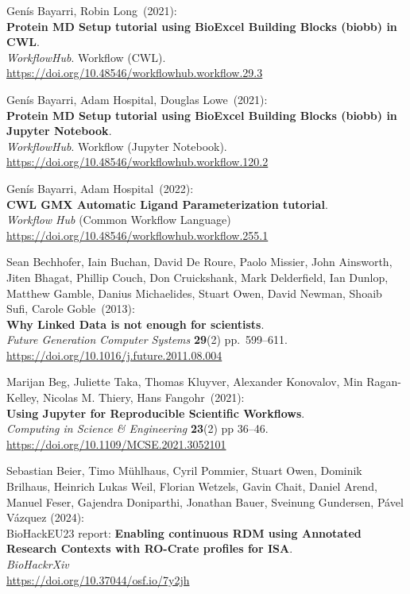 \begin{thebibliography}{9}
Genís Bayarri, Robin Long~(2021): \\
\textbf{Protein MD Setup tutorial using BioExcel Building Blocks (biobb) in CWL}.\\
\emph{WorkflowHub}. Workflow (CWL).\\
\url{https://doi.org/10.48546/workflowhub.workflow.29.3}

Genís Bayarri, Adam Hospital, Douglas Lowe~(2021): \\
\textbf{Protein MD Setup tutorial using BioExcel Building Blocks (biobb) in Jupyter Notebook}.\\
\emph{WorkflowHub}. Workflow (Jupyter Notebook).\\
\url{https://doi.org/10.48546/workflowhub.workflow.120.2}

Genís Bayarri, Adam Hospital~(2022): \\
\textbf{CWL GMX Automatic Ligand Parameterization tutorial}.\\
\emph{Workflow Hub} (Common Workflow Language)\\
\url{https://doi.org/10.48546/workflowhub.workflow.255.1}

Sean Bechhofer, Iain Buchan, David De Roure, Paolo Missier, John Ainsworth, Jiten Bhagat, Phillip Couch, Don Cruickshank, Mark Delderfield, Ian Dunlop, Matthew Gamble, Danius Michaelides, Stuart Owen, David Newman, Shoaib Sufi, Carole Goble~(2013): \\
\textbf{Why Linked Data is not enough for scientists}.\\
\emph{Future Generation Computer Systems} \textbf{29}(2)
pp.~599--611.\\
\url{https://doi.org/10.1016/j.future.2011.08.004}

Marijan Beg, Juliette Taka, Thomas Kluyver, Alexander Konovalov, Min Ragan-Kelley, Nicolas M. Thiery, Hans Fangohr~(2021): \\
\textbf{Using Jupyter for Reproducible Scientific Workflows}.\\
\emph{Computing in Science \& Engineering} \textbf{23}(2) pp 36--46.\\
\url{https://doi.org/10.1109/MCSE.2021.3052101}

Sebastian Beier, Timo Mühlhaus, Cyril Pommier, Stuart Owen, Dominik Brilhaus, Heinrich Lukas Weil, Florian Wetzels, Gavin Chait, Daniel Arend, Manuel Feser, Gajendra Doniparthi, Jonathan Bauer, Sveinung Gundersen, Pável Vázquez (2024): \\
BioHackEU23 report: \textbf{Enabling continuous RDM using Annotated Research Contexts with RO-Crate profiles for ISA}. \\
\emph{BioHackrXiv} \\
\url{https://doi.org/10.37044/osf.io/7y2jh}


\end{thebibliography}
